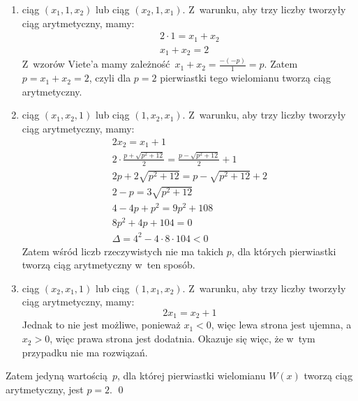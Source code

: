 \begin{enumerate}
    \item ciąg \((x_1, 1, x_2)\) lub ciąg \((x_2, 1, x_1)\). Z~warunku, aby trzy liczby tworzyły ciąg arytmetyczny, mamy:
        \begin{gather*}
            2 \cdot 1 = x_1 + x_2\\
            x_1 + x_2 = 2
        \end{gather*}
        Z~wzorów Viete'a mamy zależność \(x_1 + x_2 = \frac{-(-p)}{1} = p\). Zatem \(p = x_1 + x_2 = 2\), czyli dla \(p = 2\) pierwiastki tego wielomianu tworzą ciąg arytmetyczny.
    \item ciąg \((x_1, x_2, 1)\) lub ciąg \((1, x_2, x_1)\). Z~warunku, aby trzy liczby tworzyły ciąg arytmetyczny, mamy:
        \begin{gather*}
            2x_2 = x_1 + 1\\
            2 \cdot \frac{p + \sqrt{p^2 + 12}}{2} = \frac{p - \sqrt{p^2 + 12}}{2} + 1\\
            2p + 2\sqrt{p^2 + 12} = p - \sqrt{p^2 + 12} + 2\\
            2 - p = 3\sqrt{p^2 + 12}\\
            4 - 4p + p^2 = 9p^2 + 108\\
            8p^2 + 4p + 104 = 0\\
            \Delta = 4^2 - 4 \cdot 8 \cdot 104 < 0
        \end{gather*}
        Zatem wśród liczb rzeczywistych nie ma takich \(p\), dla których pierwiastki tworzą ciąg arytmetyczny w~ten sposób.
    \item ciąg \((x_2, x_1, 1)\) lub ciąg \((1, x_1, x_2)\). Z~warunku, aby trzy liczby tworzyły ciąg arytmetyczny, mamy:
        \begin{equation*}
            2x_1 = x_2 + 1
        \end{equation*}
        Jednak to nie jest możliwe, ponieważ \(x_1 < 0\), więc lewa strona jest ujemna, a~\(x_2 > 0\), więc prawa strona jest dodatnia. Okazuje się więc, że w~tym przypadku nie ma rozwiązań.
\end{enumerate}
Zatem jedyną wartością \(p\), dla której pierwiastki wielomianu \(W(x)\) tworzą ciąg arytmetyczny, jest \(p = 2\).
\qed
